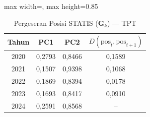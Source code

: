 \begin{table}[H]
\centering
\caption{Pergeseran Posisi STATIS ($\mathbf{G}_k$) --- TPT} \label{tab:app2jarak_statis_loading_tpt}
\begin{adjustbox}{max width=\textwidth, max height=0.85\textheight}
\begin{tabular}{|c|c|c|c|}
\hline
\textbf{Tahun} & \textbf{PC1} & \textbf{PC2} & \textbf{$D(\text{pos}_t, \text{pos}_{t+1})$} \\
\hline
2020 & 0,2793 & 0,8466 & 0,1589 \\
2021 & 0,1507 & 0,9398 & 0,1068 \\
2022 & 0,1869 & 0,8394 & 0,0178 \\
2023 & 0,1693 & 0,8417 & 0,0910 \\
2024 & 0,2591 & 0,8568 & -- \\
\hline
\end{tabular}
\end{adjustbox}
\end{table}